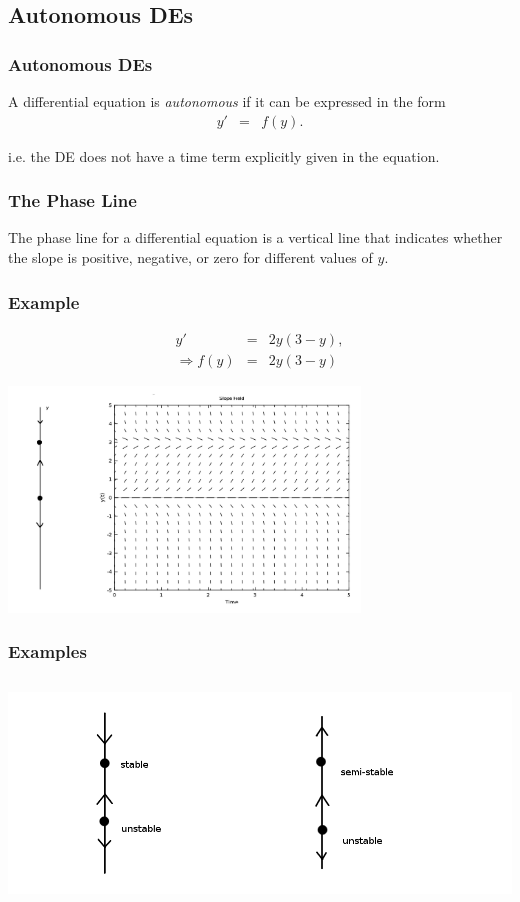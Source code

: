 \subsection{Autonomous DEs}

\begin{frame}
  \frametitle{Autonomous DEs}

  A differential equation is \textit{autonomous} if it can be
  expressed in the form
  \begin{eqnarray*}
    y' & = & f(y).
  \end{eqnarray*}

  i.e. the DE does not have a time term explicitly given in the
  equation.


\end{frame}


\begin{frame}
  \frametitle{The Phase Line}

  The phase line for a differential equation is a vertical line that
  indicates whether the slope is positive, negative, or zero for
  different values of $y$.
\end{frame}

\begin{frame}
  \frametitle{Example}
  \begin{eqnarray*}
    y' & = & 2y(3-y), \\
    \Rightarrow f(y) & = & 2y(3-y)
  \end{eqnarray*}


  \includegraphics[height=6cm]{week3PhaseLineExample1}

\end{frame}


\begin{frame}
  \frametitle{Examples}
  
  \includegraphics[height=6cm]{week3PhaseLine}

\end{frame}

